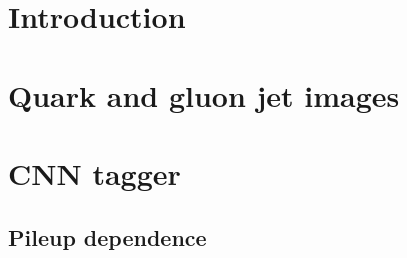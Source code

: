 \documentclass[UKenglish,texlive=2016]{\ATLASLATEXPATH atlasdoc}
\begin{document}
\maketitle

\tableofcontents

\clearpage

\section{Introduction}
\label{sec:intro}




% 


\section{Quark and gluon jet images}
\label{sec:images}



\section{CNN tagger}
\label{sec:tagger}



\subsection{Pileup dependence}
\label{sec:pileup}
\end{document}
